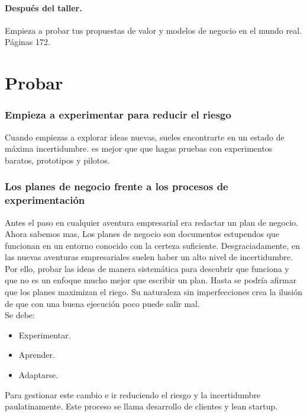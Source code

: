\documentclass[11pt]{book}
\begin{document}
\subsubsection{Después del taller.}
Empieza a probar tus propuestas de valor y modelos de negocio en el mundo real. Páginas 172.

\chapter{Probar}
\subsection{Empieza a experimentar para reducir el riesgo}
Cuando empiezas a explorar ideas nuevas, sueles encontrarte en un estado de máxima incertidumbre. es mejor que que hagas pruebas con  experimentos baratos, prototipos y pilotos. 
\subsection{Los planes de negocio frente a los procesos de experimentación}
Antes el paso en cualquier aventura empresarial era redactar un plan de negocio. Ahora sabemos mas, Los planes de negocio son documentos estupendos que funcionan en un entorno conocido con la certeza suficiente. Desgraciadamente, en las nuevas aventuras empresariales suelen haber un alto nivel de incertidumbre. Por ello, probar las ideas de manera sistemática para descubrir que funciona y que no es un enfoque mucho mejor que escribir un plan. Hasta se podría afirmar que los planes maximizan el riego. Su naturaleza sin imperfecciones crea la ilusión de que con una buena ejecución poco puede salir mal. \\
Se debe:
\begin{itemize}
\item Experimentar.
\item Aprender.
\item Adaptarse.
\end{itemize}
Para gestionar este cambio e ir reduciendo el riesgo y la incertidumbre paulatinamente. Este proceso se llama desarrollo de clientes y lean startup.
\end{document}
